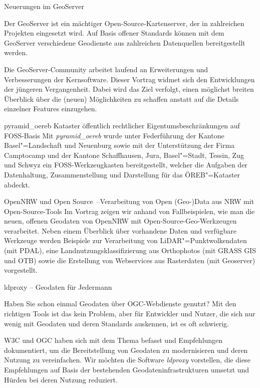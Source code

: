 %
{Neuerungen im GeoServer}%
{}%
{
Der GeoServer ist ein mächtiger Open-Source-Kartenserver, der in zahlreichen Projekten eingesetzt
wird. Auf Basis offener Standards können mit dem GeoServer verschiedene Geodienste aus zahlreichen
Datenquellen bereitgestellt werden.

Die GeoServer-Community arbeitet laufend an Erweiterungen und Verbesserungen der Kernsoftware.
Dieser Vortrag widmet sich den Entwicklungen der jüngeren Vergangenheit. Dabei wird das Ziel
verfolgt, einen möglichst breiten Überblick über die (neuen) Möglichkeiten zu schaffen anstatt auf
die Details einzelner Features einzugehen.%
}

%
{pyramid\_oereb}%
{Kataster öffentlich rechtlicher Eigentumsbeschränkungen auf FOSS-Basis}%
{
Mit \emph{pyramid\_oereb} wurde unter Federführung der Kantone Basel"=Landschaft und Neuenburg sowie
mit der Unterstützung der Firma Camptocamp und der Kantone Schaffhausen, Jura, Basel"=Stadt, Tessin,
Zug und Schwyz ein FOSS-Werkzeugkasten bereitgestellt, welcher die Aufgaben der Datenhaltung,
Zusammenstellung und Darstellung für das ÖREB"=Kataster abdeckt.%
}

%
{OpenNRW und Open Source~--\linebreak Verarbeitung von Open (Geo-)Data aus NRW mit Open-Source-Tools}%
{}%
{
Im Vortrag zeigen wir anhand von Fallbeispielen, wie man die neuen, offenen Geodaten von OpenNRW mit
Open-Source-Geo-Werkzeugen verarbeitet. Neben einem Überblick über
vorhandene Daten und verfügbare Werkzeuge werden Beispiele zur Verarbeitung von
LiDAR"=Punktwolkendaten (mit PDAL), eine Landnutzungsklassifizierung aus Orthophotos (mit GRASS GIS
und OTB) sowie die Erstellung von Webservices aus Rasterdaten (mit Geoserver) vorgestellt.%
}

%
{ldproxy -- Geodaten für Jedermann}%
{}%
{
Haben Sie schon einmal Geodaten über OGC-Webdienste genutzt? Mit den richtigen Tools ist das kein Problem,
aber für Entwickler und Nutzer, die sich nur wenig mit Geodaten und deren Standards auskennen, ist
es oft schwierig.

W3C und OGC haben sich mit dem Thema befasst und Empfehlungen dokumentiert, um
die Bereitstellung von Geodaten zu modernisieren und deren Nutzung zu vereinfachen. Wir möchten die
Software \emph{ldproxy} vorstellen, die diese Empfehlungen auf Basis der bestehenden
Geodateninfrastrukturen umsetzt und Hürden bei deren Nutzung reduziert.%
}

